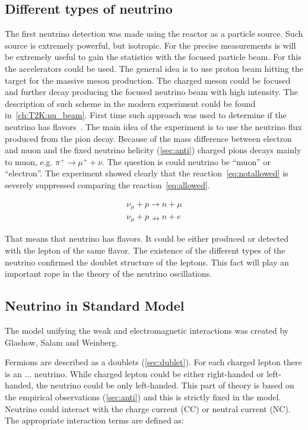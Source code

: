 \documentclass[../main.tex]{subfiles}
\begin{document}
\subsection{Different types of neutrino}
\label{sec:dublet}
The first neutrino detection was made using the reactor as a particle source. Such source is extremely powerful, but isotropic. For the precise measurements is will be extremely useful to gain the statistics with the focused particle beam. For this the accelerators could be used. The general idea is to use proton beam hitting the target for the massive meson production. The charged meson could be focused and further decay producing the focused neutrino beam with high intensity. The description of such scheme in the modern experiment could be found in~\autoref{ch:T2K:nu_beam}. First time such approach was used to determine if the neutrino has flavors~\cite{Danby1962}. The main idea of the experiment is to use the neutrino flux produced from the pion decay. Because of the mass difference between electron and muon and the fixed neutrino helicity (\autoref{sec:anti}) charged pions decays mainly to muon, e.g. $\pi^+\to\mu^++\nu$. The question is could neutrino be ``muon'' or ``electron''. The experiment showed clearly that the reaction~\autoref{eq:notallowed} is severely suppressed comparing the reaction~\autoref{eq:allowed}.

\begin{eqnarray}
\label{eq:allowed}
\nu_\mu+p\rightarrow n+\mu \\
\nu_\mu+p\nrightarrow n+e
\label{eq:notallowed}
\end{eqnarray}

That means that neutrino has flavors. It could be either produced or detected with the lepton of the same flavor. The existence of the different types of the neutrino confirmed the doublet structure of the leptons. This fact will play an important rope in the theory of the neutrino oscillations.


\subsection{Neutrino in Standard Model}
\label{sec:sm}

The model unifying the weak and electromagnetic interactions was created by Glashow, Salam and Weinberg.

Fermions are described as a doublets (\autoref{sec:dublet}). For each charged lepton there is an ... neutrino. While charged lepton could be either right-handed or left-handed, the neutrino could be only left-handed. This part of theory is based on the empirical observations (\autoref{sec:anti}) and this is strictly fixed in the model. Neutrino could interact with the charge current (CC) or neutral current (NC). The appropriate interaction terms are defined as:
\end{document}
